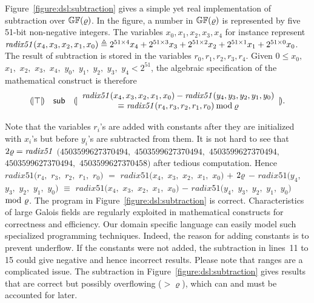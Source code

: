 Figure~\ref{figure:dsl:subtraction} gives a simple yet real
implementation of subtraction over $\mathbb{GF}(\varrho)$. 
In the figure, a number in $\mathbb{GF}(\varrho)$ 
is represented by five 51-bit non-negative integers. The variables
${x}_0, {x}_1, {x}_2, {x}_3, {x}_4$ for instance represent 
$\mathit{radix51}({x}_4, {x}_3, {x}_2, {x}_1, {x}_0) \triangleq
2^{51 \times 4} {x}_4 + 2^{51 \times 3} {x}_3 + 
2^{51 \times 2} {x}_2 + 2^{51 \times 1} {x}_1 + 
2^{51 \times 0} {x}_0$. The result of
subtraction is stored in the variables ${r}_0, {r}_1, {r}_2, {r}_3, {r}_4$. 
Given $0 \leq {x}_0,$ ${x}_1,$ ${x}_2,$ ${x}_3,$ ${x}_4,$ ${y}_0,$ 
${y}_1,$ ${y}_2,$ ${y}_3,$ ${y}_4 < 2^{51}$, 
the algebraic specification of the mathematical construct is therefore
\[
\begin{array}{rcl}
{(\!|}{\top}{|\!)} &
\mbox{\textsf{sub}} &
{(\!|}{
   \begin{array}{c}
     \mathit{radix51}({x}_4, {x}_3, {x}_2, {x}_1, {x}_0) -
     \mathit{radix51}({y}_4, {y}_3, {y}_2, {y}_1, {y}_0)\\
     \equiv 
     \mathit{radix51}({r}_4, {r}_3, {r}_2, {r}_1, {r}_0)
     \mathbin{\textmd{mod}} \varrho
   \end{array}
}{|\!)}.
\end{array}
\]

Note that the variables ${r}_i$'s are added with constants
after they are initialized with ${x}_i$'s but before
${y}_i$'s are subtracted from them. It is not hard to see that
$2\varrho = \mathit{radix51}$ $(4503599627370494,$ $4503599627370494,$
$4503599627370494,$ $4503599627370494,$ $4503599627370458)$
after tedious computation. Hence $\mathit{radix51}({r}_4,$
${r}_3,$ ${r}_2,$ ${r}_1,$ ${r}_0)$ $=$
$\mathit{radix51}({x}_4,$ ${x}_3,$ ${x}_2,$ ${x}_1,$ ${x}_0)$ $+$ 
$2 \varrho $ $-$
$\mathit{radix51}({y}_4,$ ${y}_3,$ ${y}_2,$ ${y}_1,$ ${y}_0)$ 
$\equiv $
$\mathit{radix51}({x}_4,$ ${x}_3,$ ${x}_2,$ ${x}_1,$ ${x}_0)$ $-$
$\mathit{radix51}({y}_4,$ ${y}_3,$ ${y}_2,$ ${y}_1,$ ${y}_0)$ $\mathbin{\textmd{mod}} 
\ \varrho$. The program in
Figure~\ref{figure:dsl:subtraction} is correct. 
Characteristics of large Galois fields are
regularly exploited in mathematical constructs for correctness and
efficiency. Our domain specific language can easily model such
specialized programming techniques. Indeed,
the reason for
adding constants is to prevent underflow. If the constants were not
added, the subtraction in lines~11 to 15 could give negative and hence
%
incorrect results. {Please note that ranges are a complicated
  issue. The subtraction in Figure~\ref{figure:dsl:subtraction} gives results that are correct
  but possibly {overflowing} ($>\varrho$), which can and must be
  accounted for later.} 


